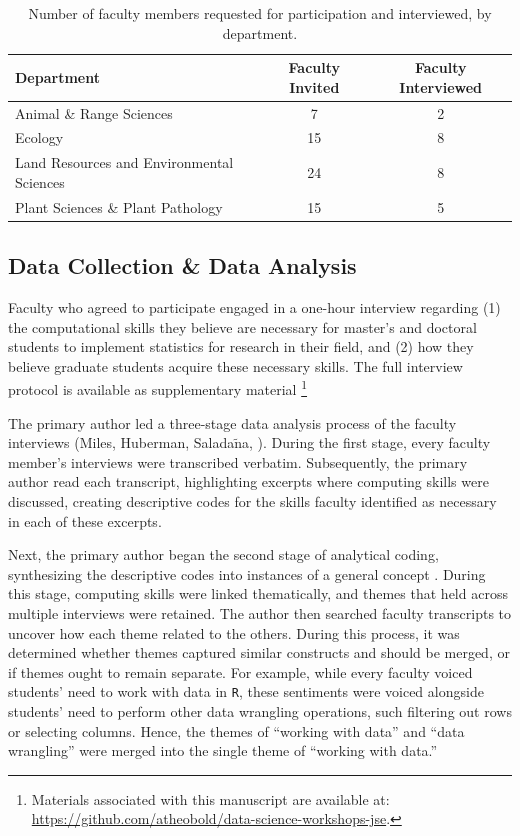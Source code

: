 \documentclass[12pt]{article}
\begin{document}
{
\begin{table}[h!]
\centering
\begin{tabular}{lcc}
\hline
Department & Faculty Invited & Faculty Interviewed  \\
\hline
Animal \& Range Sciences & 7 & 2 \\
Ecology & 15 & 8 \\
Land Resources and Environmental Sciences & 24 & 8 \\
Plant Sciences \& Plant Pathology &  15 & 5 \\ 
\hline
\end{tabular}
\caption{Number of faculty members requested for participation and interviewed,
by department.}
\label{tab:faculty}
\end{table}
}

\subsection{Data Collection \& Data Analysis}  

\noindent Faculty who agreed to participate engaged in a one-hour 
interview regarding (1) the computational skills they believe are necessary for
master's and doctoral students to implement statistics for research in their
field, and (2) how they believe graduate students acquire these necessary
skills. The full interview protocol is available as supplementary material
\footnote{Materials associated with this manuscript are available at: 
\href{https://github.com/atheobold/data-science-workshops-jse}{https://github.com/atheobold/data-science-workshops-jse}.}


\quad The primary author led a three-stage data analysis process of the faculty
interviews (Miles, Huberman, Salada$\tilde{\text{n}}$a, \citeyear{miles}). 
During the first stage, every faculty member's interviews were transcribed
verbatim. Subsequently, the primary author read each transcript, highlighting
excerpts where computing skills were discussed, creating descriptive codes for
the skills faculty identified as necessary in each of these excerpts. 

\quad Next, the primary author began the second stage of analytical coding,
synthesizing the descriptive codes into instances of a general concept 
\citep[p.\ 95]{miles}. During this stage, computing skills were linked
thematically, and themes that held across multiple interviews were retained.
The author then searched faculty transcripts to uncover how each theme related
to the others. During this process, it was determined whether themes captured
similar constructs and should be merged, or if themes ought to remain separate. 
For example, while every faculty voiced students' need to work with data in 
\texttt{R}, these sentiments were voiced alongside students' need to perform
other data wrangling operations, such filtering out rows or selecting columns. 
Hence, the themes of ``working with data'' and ``data wrangling'' were merged
into the single theme of ``working with data.'' 
\end{document}
